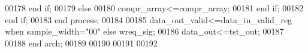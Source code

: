 \begin{DoxyCode}
00178           \textcolor{keywordflow}{end} \textcolor{keywordflow}{if};
00179         \textcolor{keywordflow}{else} 
00180           \textcolor{vhdlchar}{compr_array}\textcolor{vhdlchar}{<=}\textcolor{vhdlchar}{compr_array};
00181         \textcolor{keywordflow}{end} \textcolor{keywordflow}{if};
00182         \textcolor{keywordflow}{end} \textcolor{keywordflow}{if};
00183     \textcolor{keywordflow}{end} \textcolor{keywordflow}{process}; 
00184 
00185 \textcolor{vhdlchar}{data_out_valid}\textcolor{vhdlchar}{<=}\textcolor{vhdlchar}{data_in_valid_reg} \textcolor{keywordflow}{when} \textcolor{vhdlchar}{sample_width}\textcolor{vhdlchar}{=}\textcolor{vhdllogic}{"00"} \textcolor{keywordflow}{else} \textcolor{vhdlchar}{wreq_sig};
00186 \textcolor{vhdlchar}{data_out}\textcolor{vhdlchar}{<=}\textcolor{vhdlchar}{tst_out};
00187   
00188 \textcolor{keywordflow}{end} \textcolor{vhdlchar}{arch};   
00189 
00190 
00191 
00192 
\end{DoxyCode}
